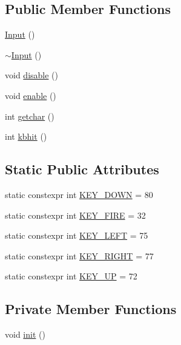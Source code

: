 \subsection*{Public Member Functions}
\begin{DoxyCompactItemize}
\item 
\hyperlink{classAsteroids_1_1UI_1_1ClientTextUI_1_1Input_aef07e99edf7199b0d89c185fbac19418}{Input} ()
\item 
\hyperlink{classAsteroids_1_1UI_1_1ClientTextUI_1_1Input_aa7c479159f14b8f97a39ed355d934be2}{$\sim$\+Input} ()
\item 
void \hyperlink{classAsteroids_1_1UI_1_1ClientTextUI_1_1Input_ae559e26e3f9e51e16955abe32166d5fb}{disable} ()
\item 
void \hyperlink{classAsteroids_1_1UI_1_1ClientTextUI_1_1Input_a362d0e70ddb758adfcda8bec76082893}{enable} ()
\item 
int \hyperlink{classAsteroids_1_1UI_1_1ClientTextUI_1_1Input_a74d53289eb6c84ceb5156e42edda07aa}{getchar} ()
\item 
int \hyperlink{classAsteroids_1_1UI_1_1ClientTextUI_1_1Input_adf6f8d148560492a86919701b59b9b5f}{kbhit} ()
\end{DoxyCompactItemize}
\subsection*{Static Public Attributes}
\begin{DoxyCompactItemize}
\item 
static constexpr int \hyperlink{classAsteroids_1_1UI_1_1ClientTextUI_1_1Input_a031577847b48b741ec3bf92d452d0dc4}{K\+E\+Y\+\_\+\+D\+O\+WN} = 80
\item 
static constexpr int \hyperlink{classAsteroids_1_1UI_1_1ClientTextUI_1_1Input_ab1c4f7e7a3150072b9fadf11b27d4d54}{K\+E\+Y\+\_\+\+F\+I\+RE} = 32
\item 
static constexpr int \hyperlink{classAsteroids_1_1UI_1_1ClientTextUI_1_1Input_a27be37c3b4ab73f1219cdb4bc8fc7759}{K\+E\+Y\+\_\+\+L\+E\+FT} = 75
\item 
static constexpr int \hyperlink{classAsteroids_1_1UI_1_1ClientTextUI_1_1Input_ac2f818125230ed93470409bfdbb56332}{K\+E\+Y\+\_\+\+R\+I\+G\+HT} = 77
\item 
static constexpr int \hyperlink{classAsteroids_1_1UI_1_1ClientTextUI_1_1Input_a394d50e01f0db9d57630270d4dcc0a59}{K\+E\+Y\+\_\+\+UP} = 72
\end{DoxyCompactItemize}
\subsection*{Private Member Functions}
\begin{DoxyCompactItemize}
\item 
void \hyperlink{classAsteroids_1_1UI_1_1ClientTextUI_1_1Input_acc8084e10e1ba1db0bf02e48c6abe740}{init} ()
\end{DoxyCompactItemize}
